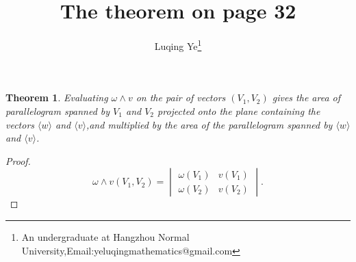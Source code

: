 \documentclass{article}
\newtheorem*{theo}{Theorem}
\newenvironment{theorem}
{\bigskip\begin{mdframed}\begin{theo}}
    {\end{theo}\end{mdframed}\bigskip}
\newcommand{\wg}{\wedge} \newcommand{\R}{{\mathbb R}}
\begin{document}
\title{The theorem on page 32}\author{Luqing Ye\footnote{An undergraduate at Hangzhou Normal University,Email:yeluqingmathematics@gmail.com}}
\maketitle\noindent
\begin{theorem}
  Evaluating $\omega \wg v$ on the pair of vectors $(V_1,V_2)$ gives
  the area of parallelogram spanned by $V_1$ and $V_2$ projected onto
  the plane containing the vectors $\langle w\rangle$ and $\langle
  v\rangle$,and multiplied by the area of the parallelogram spanned by $\langle w\rangle$ and $\langle
  v\rangle$.
\end{theorem}
\begin{proof}
$$
\omega\wg v(V_1,V_2)=
\begin{vmatrix}
  \omega(V_1)&v(V_1)\\
\omega(V_2)&v(V_2)
\end{vmatrix}.
$$
\end{proof}





% 
% 
\end{document}
